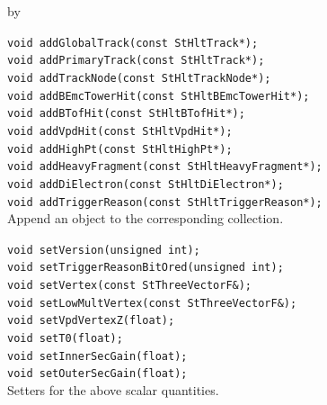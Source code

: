 \documentclass[twoside]{article}
\newcommand{\entrylabel}[1]{\mbox{\textbf{{#1}}}\hfil}%
\newenvironment{entry}
{\begin{list}{}%
    {\renewcommand{\makelabel}{\entrylabel}%
     \setlength{\labelwidth}{90pt}%
     \setlength{\leftmargin}{\labelwidth}
     \advance\leftmargin by \labelsep%
      }%
    }%
  {\end{list}}
\newcommand{\Entrylabel}[1]%
{\raisebox{0pt}[1ex][0pt]{\makebox[\labelwidth][l]%
    {\parbox[t]{\labelwidth}{\hspace{0pt}\textbf{{#1}}}}}}
\newenvironment{Entry}%
{\renewcommand{\entrylabel}{\Entrylabel}\begin{entry}}%
  {\end{entry}}
\begin{document}
\begin{Entry}
    \verb+void addGlobalTrack(const StHltTrack*);+\\
    \verb+void addPrimaryTrack(const StHltTrack*);+\\
    \verb+void addTrackNode(const StHltTrackNode*);+\\
    \verb+void addBEmcTowerHit(const StHltBEmcTowerHit*);+\\
    \verb+void addBTofHit(const StHltBTofHit*);+\\
    \verb+void addVpdHit(const StHltVpdHit*);+\\
    \verb+void addHighPt(const StHltHighPt*);+\\
    \verb+void addHeavyFragment(const StHltHeavyFragment*);+\\
    \verb+void addDiElectron(const StHltDiElectron*);+\\
    \verb+void addTriggerReason(const StHltTriggerReason*);+\\
    Append an object to the corresponding collection.

    \verb+void setVersion(unsigned int);+\\
    \verb+void setTriggerReasonBitOred(unsigned int);+\\
    \verb+void setVertex(const StThreeVectorF&);+\\
    \verb+void setLowMultVertex(const StThreeVectorF&);+\\
    \verb+void setVpdVertexZ(float);+\\
    \verb+void setT0(float);+\\
    \verb+void setInnerSecGain(float);+\\
    \verb+void setOuterSecGain(float);+\\
    Setters for the above scalar quantities.
\end{Entry}
\clearpage

\end{document}
